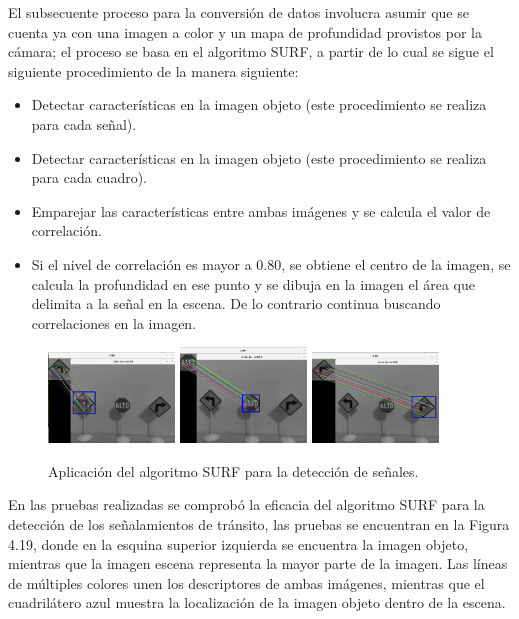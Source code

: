 \par El subsecuente proceso para la conversión de datos involucra asumir que se cuenta ya con una imagen a color y un mapa de profundidad provistos por la cámara; el proceso se basa en el algoritmo SURF, a partir de lo cual se sigue el siguiente procedimiento de la manera siguiente:
\begin{itemize}
	\item Detectar características en la imagen objeto (este procedimiento se realiza para cada señal).
	\item Detectar características en la imagen objeto (este procedimiento se realiza para cada cuadro).
	\item Emparejar las características entre ambas imágenes y se calcula el valor de correlación.
	\item Si el nivel de correlación es mayor a 0.80, se obtiene el centro de la imagen, se calcula la profundidad en ese punto y se dibuja en la imagen el área que delimita a la señal en la escena. De lo contrario continua buscando correlaciones en la imagen.
\end{itemize}
\begin{figure}[htbp!]
	\centering
	\includegraphics[width=0.3\textwidth]{./Figuras/SURFDere}
	\includegraphics[width=0.3\textwidth]{./Figuras/SURFAlto}
	\includegraphics[width=0.3\textwidth]{./Figuras/SURFIzq}
	\label{fig:surf}
	\caption{Aplicación del algoritmo SURF para la detección de señales.}
\end{figure}
\par En las pruebas realizadas se comprobó la eficacia del algoritmo SURF para la detección de los señalamientos de tránsito, las pruebas se encuentran en la Figura 4.19, donde en la esquina superior izquierda se encuentra la imagen objeto, mientras que la imagen escena representa la mayor parte de la imagen. Las líneas de múltiples colores unen los descriptores de ambas imágenes, mientras que el cuadrilátero azul muestra la localización de la imagen objeto dentro de la escena.
